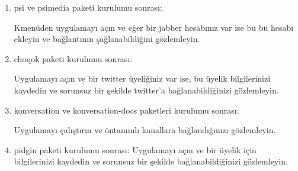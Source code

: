 \documentclass[a4paper,10pt]{article}
\begin{document}
\begin{enumerate}
\item psi ve psimedia paketi kurulumu sonrası:

Kmenüden uygulamayı açın ve eğer bir jabber hesabınız var ise bu bu hesabı ekleyin ve bağlantının şağlanabildiğini gözlemleyin.

\item choqok paketi kurulumu sonrası:

Uygulamayı açın ve bir twitter üyeliğiniz var ise, bu üyelik bilgilerinizi kaydedin ve sorunsuz bir şekilde twitter'a bağlanabildiğinizi gözlemleyin.	
\item konversation ve konversation-docs paketleri kurulumu sonrası:

Uygulamayı çalıştırın ve öntanımlı kanallara bağlandığınızı gözlemleyin.

\item pidgin paketi kurulumu sonrası:
Uygulamayı açın ve bir üyelik için bilgilerinizi kaydedin ve sorunsuz bir şekilde bağlanabildiğinizi gözlemleyin.

\end{enumerate}
\end{document}

